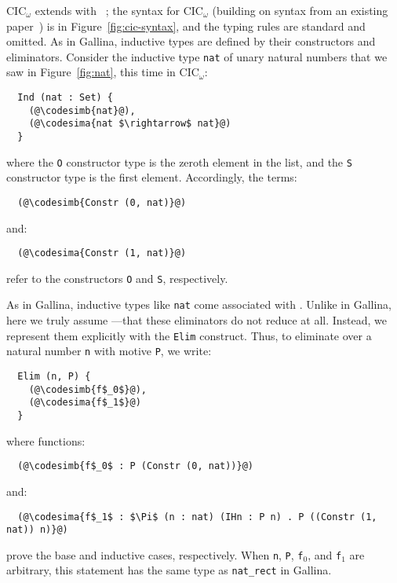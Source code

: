 CIC$_{\omega}$ extends  with ~\cite{inductive};
the syntax for CIC$_{\omega}$ (building on syntax from an existing paper~\cite{Timany2015FirstST}) is in Figure~\ref{fig:cic-syntax},
and the typing rules are standard and omitted.
As in Gallina, inductive types are defined by their constructors and eliminators.
Consider the inductive type \lstinline{nat} of unary natural numbers that we saw in Figure~\ref{fig:nat},
this time in CIC$_{\omega}$: %

\begin{lstlisting}
  Ind (nat : Set) {
    (@\codesimb{nat}@),
    (@\codesima{nat $\rightarrow$ nat}@)
  }
\end{lstlisting}
where the \lstinline{O} constructor type is the zeroth element in the list, and the \lstinline{S} constructor type is the first element.
Accordingly, the terms:

\begin{lstlisting}
  (@\codesimb{Constr (0, nat)}@)
\end{lstlisting}
and:

\begin{lstlisting}
  (@\codesima{Constr (1, nat)}@)
\end{lstlisting}
refer to the constructors \lstinline{O} and \lstinline{S}, respectively.

As in Gallina, inductive types like \lstinline{nat} come associated with .
Unlike in Gallina, here we truly assume ---that these eliminators
do not reduce at all.
Instead, we represent them explicitly with the \lstinline{Elim} construct.
Thus, to eliminate over a natural number \lstinline{n} with motive \lstinline{P},
we write: %

\begin{lstlisting}
  Elim (n, P) {
    (@\codesimb{f$_0$}@),
    (@\codesima{f$_1$}@)
  }
\end{lstlisting}
where functions:

\begin{lstlisting}
  (@\codesimb{f$_0$ : P (Constr (0, nat))}@)
\end{lstlisting}
and:

\begin{lstlisting}
  (@\codesima{f$_1$ : $\Pi$ (n : nat) (IHn : P n) . P ((Constr (1, nat)) n)}@)
\end{lstlisting}
prove the base and inductive cases, respectively.
When \lstinline{n}, \lstinline{P}, \lstinline{f}$_0$, and \lstinline{f}$_1$ are arbitrary,
this statement has the same type as \lstinline{nat_rect} in Gallina.

